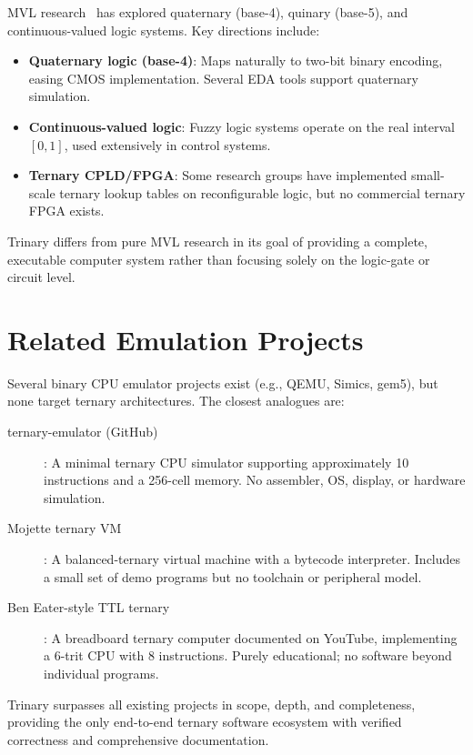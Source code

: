 \documentclass[12pt,a4paper,twoside]{book}
\theoremstyle{trinarytheorem}
\theoremstyle{trinarydefinition}
\newcommand{\code}[1]{\textsf{#1}}
\begin{document}
MVL research~\cite{hurts1989comparison,smith1997mvl,epstein1985mvl} has
explored quaternary (base-4), quinary (base-5), and continuous-valued
logic systems. Key directions include:
\begin{itemize}
    \item \textbf{Quaternary logic (base-4)}: Maps naturally to two-bit
          binary encoding, easing CMOS implementation. Several EDA tools
          support quaternary simulation.
    \item \textbf{Continuous-valued logic}: Fuzzy logic systems operate on
          the real interval $[0,1]$, used extensively in control systems.
    \item \textbf{Ternary CPLD/FPGA}: Some research groups have implemented
          small-scale ternary lookup tables on reconfigurable logic, but
          no commercial ternary FPGA exists.
\end{itemize}
Trinary differs from pure MVL research in its goal of providing a complete,
executable computer system rather than focusing solely on the logic-gate
or circuit level.

\section{Related Emulation Projects}

Several binary CPU emulator projects exist (e.g., QEMU, Simics, gem5),
but none target ternary architectures. The closest analogues are:

\begin{description}
    \item[\code{ternary-emulator} (GitHub)]: A minimal ternary CPU
          simulator supporting approximately 10 instructions and a 256-cell
          memory. No assembler, OS, display, or hardware simulation.
    \item[\code{Mojette ternary VM}]: A balanced-ternary virtual machine
          with a bytecode interpreter. Includes a small set of demo
          programs but no toolchain or peripheral model.
    \item[\code{Ben Eater-style TTL ternary}]: A breadboard ternary
          computer documented on YouTube, implementing a 6-trit CPU with 8
          instructions. Purely educational; no software beyond individual
          programs.
\end{description}

Trinary surpasses all existing projects in scope, depth, and completeness,
providing the only end-to-end ternary software ecosystem with verified
correctness and comprehensive documentation.
\end{document}
